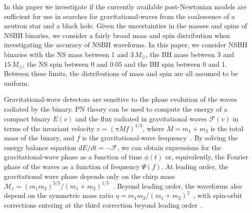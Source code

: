 In this paper we investigate if the currently available post-Newtonian models
are sufficient for use in searches for gravitational-waves from the
coalescence of a neutron star and a black hole. Given the uncertainties in the masses and spins of
\ac{NSBH} binaries, we consider a fairly broad mass and spin
distribution when investigating the accuracy of \ac{NSBH} waveforms.
In this paper, we consider \ac{NSBH} binaries with the \ac{NS} mass between 1
and $3\, M_\odot$, the \ac{BH} mass between $3$ and $15\, M_\odot$, the
\ac{NS} spin between 0 and $0.05$ and the
\ac{BH} spin between 0 and 1. Between these limits, the distributions of mass and spin are all
assumed to be uniform. 

Gravitational-wave detectors are sensitive to the phase evolution of the waves radiated
by the binary. \ac{PN} theory can be used to compute the
energy of a compact binary $E(v)$ and the flux radiated in gravitational waves
$\mathcal{F}(v)$ in terms of the invariant velocity $v = (\pi M f)^{1/3}$,
where $M = m_1 + m_2$ is the total mass of the binary, and $f$ is the
gravitational-wave frequency~\cite{Blanchet:2006zz}. By solving the energy
balance equation $dE/dt = - \mathcal{F}$, we can obtain expressions for the
gravitational-wave phase as a function of time $\phi(t)$ or, equivalently, the
Fourier phase of the waves as a function of frequency $\Psi(f)$. At leading
order, the gravitational wave phase depends only on the chirp mass
$\mathcal{M}_c = (m_1 m_2)^{3/5} / (m_1 + m_2)^{1/5}$~\cite{Peters:1963ux}.
Beyond leading order, the waveforms also depend on the symmetric mass
ratio $\eta = m_1 m_2 / (m_1 + m_2)^2$~\cite{Wiseman:1993aj,Blanchet:1995fg,Blanchet:1995ez,Blanchet:1996pi,
Blanchet:2001ax, Blanchet:2004ek}, with spin-orbit 
corrections entering at the third correction beyond leading order~\cite{Kidder:1992fr,
Kidder:1995zr,Arun:2008kb,Blanchet:2012sm,Bohe:2013cla}.

